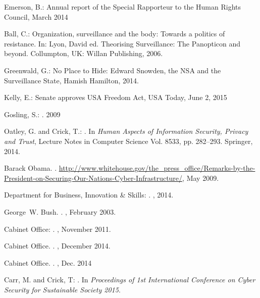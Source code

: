 \documentclass{llncs}
\begin{document}
%
%
\begin{thebibliography}{}
%
Emerson, B.:
Annual report of the Special Rapporteur to the Human Rights Council, March 2014

Ball, C.:
Organization, surveillance and the body: Towards a politics of resistance. In: Lyon, David ed. Theorising Surveillance: The Panopticon and beyond. Collumpton, UK: Willan Publishing, 2006.

Greenwald, G.:
No Place to Hide: Edward Snowden, the NSA and the Surveillance State, Hamish Hamilton, 2014.

Kelly, E.:
Senate approves USA Freedom Act, {USA Today},  June 2, 2015

Gosling, S.:
.
 2009

Oatley, G. and Crick, T.:
.
\newblock In {\em {Human Aspects of Information Security, Privacy and Trust}}, Lecture Notes in Computer Science Vol. 8533, pp. 282--293.
  Springer, 2014.

Barack Obama.
.
\newblock
  \url{http://www.whitehouse.gov/the_press_office/Remarks-by-the-President-on-Securing-Our-Nations-Cyber-Infrastructure/},
  May 2009.

{Department for Business, Innovation \& Skills}:
.
, 2014.

George~W. Bush.
.
, February 2003.

{Cabinet Office}:
.
, November 2011.

{Cabinet Office}.
.
, December 2014.

{Cabinet Office}.
.
, Dec. 2014

Carr, M. and Crick, T:
.
\newblock In {\em {Proceedings of 1st International Conference on Cyber
  Security for Sustainable Society 2015}}.


\end{thebibliography}
\end{document}
